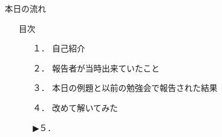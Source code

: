 \begin{frame}{本日の流れ}
  \begin{itemize}
      \item[] 目次
      \begin{itemize}[itemsep=1.3ex, leftmargin=1cm]
        \item[１．] {\color{cud_lightgray} 自己紹介}
        \item[２．] {\color{cud_lightgray} 報告者が当時出来ていたこと}
        \item[３．] {\color{cud_lightgray} 本日の例題と以前の勉強会で報告された結果}
        \item[４．] {\color{cud_lightgray} 改めて解いてみた}
        \item[▶５．] 
      \end{itemize}
  \end{itemize}
\end{frame}
